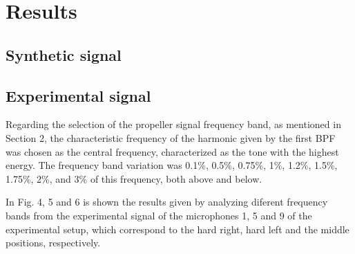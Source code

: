\documentclass[10pt,fleqn,a4paper,twoside]{article}
\begin{document}
\section{Results}
\subsection{Synthetic signal}
\subsection{Experimental signal}
Regarding the selection of the propeller signal frequency band, as mentioned in Section 2, the characteristic frequency of the harmonic given by the first BPF was chosen as the central frequency, characterized as the tone with the highest energy. The frequency band variation was 0.1\%, 0.5\%, 0.75\%, 1\%, 1.2\%, 1.5\%, 1.75\%, 2\%, and 3\% of this frequency, both above and below. 

In Fig. 4, 5 and 6 is shown the results given by analyzing diferent frequency bands from the experimental signal of the microphones 1, 5 and 9 of the experimental setup, which correspond to the hard right, hard left and the middle positions, respectively.
\end{document}
